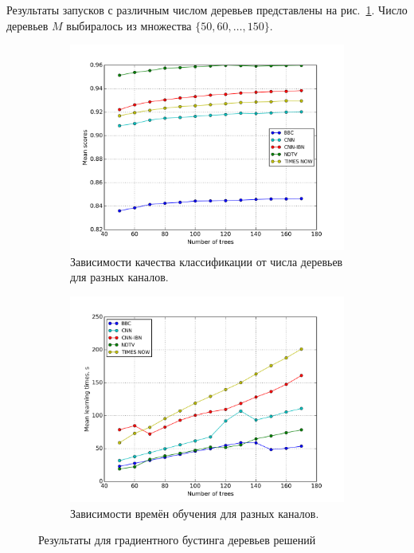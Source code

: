 Результаты запусков с различным числом деревьев представлены на рис.~\ref{fig:gtb-base}. Число деревьев \(M\) выбиралось из множества \(\{50,60,\dotsc,150\}\).
\begin{figure}[h!]
    \centering
	\begin{subfigure}{0.45\textwidth}
		\includegraphics[width=\textwidth]{images/gtb.png}
		\caption{Зависимости качества классификации от числа деревьев для разных каналов.}
	\end{subfigure}
	\begin{subfigure}{0.45\textwidth}
		\includegraphics[width=\textwidth]{images/gtbTime.png}
		\caption{Зависимости времён обучения для разных каналов.}
	\end{subfigure}
	\caption{Результаты для градиентного бустинга деревьев решений}\label{fig:gtb-base}
\end{figure}

